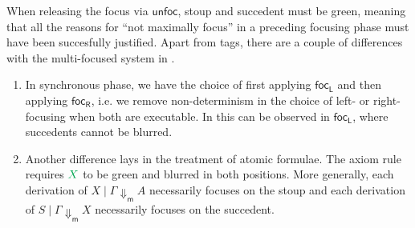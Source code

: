 \documentclass[runningheads]{llncs}
\newcommand{\tr}{\otimes \mathsf{R}}
\newcommand{\lleft}{{\multimap}\mathsf{L}}
\newcommand{\pass}{\mathsf{pass}}
\newcommand{\unitl}{\mathsf{IL}}
\newcommand{\unitr}{\mathsf{IR}}
\newcommand{\otR}{\tr}
\newcommand{\lolliL}{\lleft}
\newcommand{\IL}{\unitl}
\newcommand{\IR}{\unitr}
\newcommand{\ax}{\mathsf{ax}}
\newcommand{\red}[1]{{\color{Red}#1}}
\newcommand{\green}[1]{{\color{Green}#1}}
\newcommand{\up}{\Uparrow}
\newcommand{\dn}{\Downarrow}
\newcommand{\dnm}{\Downarrow_{\mathsf{m}}}
\newcommand{\focL}{\mathsf{foc_L}}
\newcommand{\focR}{\mathsf{foc_R}}
\newcommand{\blurL}{\mathsf{blur_L}}
\newcommand{\unfoc}{\mathsf{unfoc}}
\begin{document}

When releasing the focus via $\unfoc$, stoup and succedent must be green, meaning that all the reasons for ``not maximally focus'' in a preceding focusing phase must have been succesfully justified. Apart from tags, there are a couple of differences with the multi-focused system in .
\begin{enumerate}
  \item In synchronous phase, we have the choice of first applying $\focL$ and then applying $\focR$, i.e. we remove non-determinism in the choice of left- or right-focusing when both are executable. In  this can be observed in $\focL$, where succedents cannot be blurred. %
\item Another difference lays in the treatment of atomic formulae. The axiom rule requires $\green{X}$ to be green and blurred in both positions. More generally, %
each derivation of $X \mid \Gamma \dnm A$ necessarily focuses on the stoup and each derivation of $S \mid \Gamma \dnm X$ necessarily focuses on the succedent.
\end{enumerate}
\end{document}
